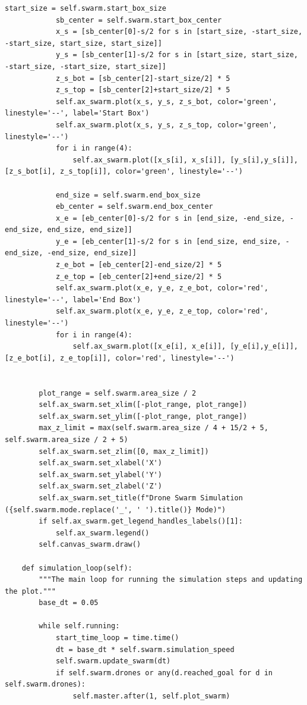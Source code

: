 \documentclass[11pt]{article}
\begin{document}
\begin{lstlisting}[style=pythonstyle]
            start_size = self.swarm.start_box_size
            sb_center = self.swarm.start_box_center
            x_s = [sb_center[0]-s/2 for s in [start_size, -start_size, -start_size, start_size, start_size]]
            y_s = [sb_center[1]-s/2 for s in [start_size, start_size, -start_size, -start_size, start_size]]
            z_s_bot = [sb_center[2]-start_size/2] * 5
            z_s_top = [sb_center[2]+start_size/2] * 5
            self.ax_swarm.plot(x_s, y_s, z_s_bot, color='green', linestyle='--', label='Start Box')
            self.ax_swarm.plot(x_s, y_s, z_s_top, color='green', linestyle='--')
            for i in range(4):
                self.ax_swarm.plot([x_s[i], x_s[i]], [y_s[i],y_s[i]], [z_s_bot[i], z_s_top[i]], color='green', linestyle='--')

            end_size = self.swarm.end_box_size
            eb_center = self.swarm.end_box_center
            x_e = [eb_center[0]-s/2 for s in [end_size, -end_size, -end_size, end_size, end_size]]
            y_e = [eb_center[1]-s/2 for s in [end_size, end_size, -end_size, -end_size, end_size]]
            z_e_bot = [eb_center[2]-end_size/2] * 5
            z_e_top = [eb_center[2]+end_size/2] * 5
            self.ax_swarm.plot(x_e, y_e, z_e_bot, color='red', linestyle='--', label='End Box')
            self.ax_swarm.plot(x_e, y_e, z_e_top, color='red', linestyle='--')
            for i in range(4):
                self.ax_swarm.plot([x_e[i], x_e[i]], [y_e[i],y_e[i]], [z_e_bot[i], z_e_top[i]], color='red', linestyle='--')


        plot_range = self.swarm.area_size / 2
        self.ax_swarm.set_xlim([-plot_range, plot_range])
        self.ax_swarm.set_ylim([-plot_range, plot_range])
        max_z_limit = max(self.swarm.area_size / 4 + 15/2 + 5, self.swarm.area_size / 2 + 5)
        self.ax_swarm.set_zlim([0, max_z_limit])
        self.ax_swarm.set_xlabel('X')
        self.ax_swarm.set_ylabel('Y')
        self.ax_swarm.set_zlabel('Z')
        self.ax_swarm.set_title(f"Drone Swarm Simulation ({self.swarm.mode.replace('_', ' ').title()} Mode)")
        if self.ax_swarm.get_legend_handles_labels()[1]:
            self.ax_swarm.legend()
        self.canvas_swarm.draw()

    def simulation_loop(self):
        """The main loop for running the simulation steps and updating the plot."""
        base_dt = 0.05

        while self.running:
            start_time_loop = time.time()
            dt = base_dt * self.swarm.simulation_speed
            self.swarm.update_swarm(dt)
            if self.swarm.drones or any(d.reached_goal for d in self.swarm.drones):
                self.master.after(1, self.plot_swarm)


\end{lstlisting}
\end{document}
